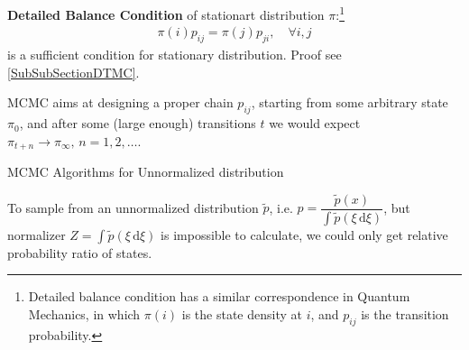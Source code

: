     \textbf{Detailed Balance Condition} of stationart distribution $ \pi $:\footnote{Detailed balance condition has a similar correspondence in Quantum Mechanics, in which $ \pi(i) $ is the state density at $ i $, and $ p_{ij} $ is the transition probability.}
    \begin{align}
        \pi(i)p_{ij}=\pi(j)p_{ji} ,\quad \forall i,j
    \end{align}
    is a sufficient condition for stationary distribution. Proof see \autoref{SubSubSectionDTMC}.
    
    MCMC aims at designing a proper chain $ p_{ij} $, starting from some arbitrary state $ \pi_0 $, and after some (large enough) transitions $ t $ we would expect $ \pi_{t+n}\to \pi_\infty,\,n=1,2,\ldots  $.
    

    
\begin{point}
    MCMC Algorithms for Unnormalized distribution
\end{point}

    To sample from an unnormalized distribution $ \tilde{p} $, i.e. $ p=\dfrac{\tilde{p}(x)}{\int \tilde{p}(\xi \,\mathrm{d}\xi)} $, but normalizer $ Z=\int \tilde{p}(\xi \,\mathrm{d}\xi) $ is impossible to calculate, we could only get relative probability ratio of states.



